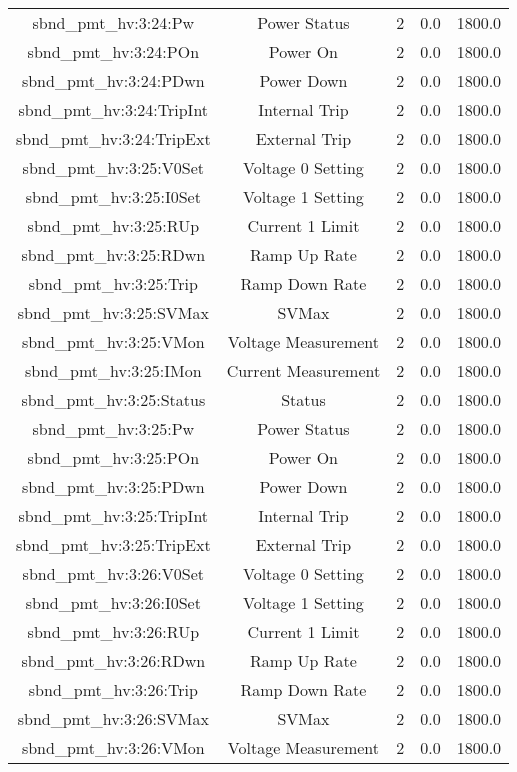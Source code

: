 \begin{table}[ptb]
\begin{tabular}{c | c c c c}
sbnd_pmt_hv:3:24:Pw & Power Status & 2 & 0.0 & 1800.0\\ 
sbnd_pmt_hv:3:24:POn & Power On & 2 & 0.0 & 1800.0\\ 
sbnd_pmt_hv:3:24:PDwn & Power Down & 2 & 0.0 & 1800.0\\ 
sbnd_pmt_hv:3:24:TripInt & Internal Trip & 2 & 0.0 & 1800.0\\ 
sbnd_pmt_hv:3:24:TripExt & External Trip & 2 & 0.0 & 1800.0\\ 
sbnd_pmt_hv:3:25:V0Set & Voltage 0 Setting & 2 & 0.0 & 1800.0\\ 
sbnd_pmt_hv:3:25:I0Set & Voltage 1 Setting & 2 & 0.0 & 1800.0\\ 
sbnd_pmt_hv:3:25:RUp & Current 1 Limit & 2 & 0.0 & 1800.0\\ 
sbnd_pmt_hv:3:25:RDwn & Ramp Up Rate & 2 & 0.0 & 1800.0\\ 
sbnd_pmt_hv:3:25:Trip & Ramp Down Rate & 2 & 0.0 & 1800.0\\ 
sbnd_pmt_hv:3:25:SVMax & SVMax & 2 & 0.0 & 1800.0\\ 
sbnd_pmt_hv:3:25:VMon & Voltage Measurement & 2 & 0.0 & 1800.0\\ 
sbnd_pmt_hv:3:25:IMon & Current Measurement & 2 & 0.0 & 1800.0\\ 
sbnd_pmt_hv:3:25:Status & Status & 2 & 0.0 & 1800.0\\ 
sbnd_pmt_hv:3:25:Pw & Power Status & 2 & 0.0 & 1800.0\\ 
sbnd_pmt_hv:3:25:POn & Power On & 2 & 0.0 & 1800.0\\ 
sbnd_pmt_hv:3:25:PDwn & Power Down & 2 & 0.0 & 1800.0\\ 
sbnd_pmt_hv:3:25:TripInt & Internal Trip & 2 & 0.0 & 1800.0\\ 
sbnd_pmt_hv:3:25:TripExt & External Trip & 2 & 0.0 & 1800.0\\ 
sbnd_pmt_hv:3:26:V0Set & Voltage 0 Setting & 2 & 0.0 & 1800.0\\ 
sbnd_pmt_hv:3:26:I0Set & Voltage 1 Setting & 2 & 0.0 & 1800.0\\ 
sbnd_pmt_hv:3:26:RUp & Current 1 Limit & 2 & 0.0 & 1800.0\\ 
sbnd_pmt_hv:3:26:RDwn & Ramp Up Rate & 2 & 0.0 & 1800.0\\ 
sbnd_pmt_hv:3:26:Trip & Ramp Down Rate & 2 & 0.0 & 1800.0\\ 
sbnd_pmt_hv:3:26:SVMax & SVMax & 2 & 0.0 & 1800.0\\ 
sbnd_pmt_hv:3:26:VMon & Voltage Measurement & 2 & 0.0 & 1800.0\\ 

\end{tabular}
\end{table}
